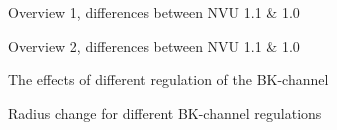 \begin{landscape}
	
	\begin{figure}[h!]
		\centering
		\tiny 
		\setlength\figureheight{2 cm} 
		\setlength\figurewidth{18 cm}
		
		\caption{Overview 1, differences between NVU 1.1  \& 1.0}
		\label{fig:NVU10a}
	\end{figure}
	
	\begin{figure}[h!]
		\centering
		\tiny 
		\setlength\figureheight{2.5 cm} 
		\setlength\figurewidth{9 cm}
		
		\caption{Overview 2, differences between NVU 1.1  \& 1.0  }
		\label{fig:NVU10b}
	\end{figure}
		\begin{figure}[h!]
			\centering
			\tiny  
			\setlength\figureheight{2.5 cm} 
			\setlength\figurewidth{9 cm}
			
			\caption{The effects of different regulation of the BK-channel}
			\label{fig:BKeff}
		\end{figure}
		
		\begin{figure}[h!]
			\centering
			\tiny 
			\setlength\figureheight{7.5 cm} 
			\setlength\figurewidth{18 cm}
			
			\caption{Radius change for different BK-channel regulations}
			\label{fig:SMCfluxes}
		\end{figure}
\end{landscape}

%